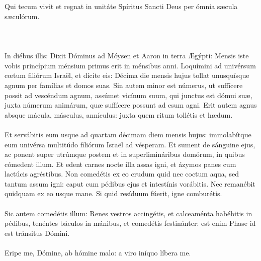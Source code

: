 \documentclass[12pt, a4paper]{article}
\begin{document}
	\\\\
	Qui tecum vivit et regnat in unitáte Spíritus Sancti Deus per ómnia sæcula sæculórum.
	\\\\
	\\
	\\
	In diébus illis: Dixit Dóminus ad Móysen et Aaron in terra Ægýpti: Mensis iste vobis princípium ménsium primus erit in ménsibus anni. Loquímini ad univérsum cœtum filiórum Israël, et dícite eis: Décima die mensis hujus tollat unusquísque agnum per famílias et domos suas. Sin autem minor est númerus, ut suffícere possit ad vescéndum agnum, assúmet vicínum suum, qui junctus est dómui suæ, juxta númerum animárum, quæ suffícere possunt ad esum agni. Erit autem agnus absque mácula, másculus, annículus: juxta quem ritum tollétis et hædum.
	\\\\
	Et servábitis eum usque ad quartam décimam diem mensis hujus: immolabítque eum univérsa multitúdo filiórum Israël ad vésperam. Et sument de sánguine ejus, ac ponent super utrúmque postem et in superlimináribus domórum, in quibus cómedent illum. Et edent carnes nocte illa assas igni, et ázymos panes cum lactúcis agréstibus. Non comedétis ex eo crudum quid nec coctum aqua, sed tantum assum igni: caput cum pédibus ejus et intestínis vorábitis. Nec remanébit quidquam ex eo usque mane. Si quid resíduum fúerit, igne comburétis.
	\\\\
	Sic autem comedétis illum: Renes vestros accingétis, et calceaménta habébitis in pédibus, tenéntes báculos in mánibus, et comedétis festinánter: est enim Phase id est tránsitus Dómini.
	\\\\
	Eripe me, Dómine, ab hómine malo: a viro iníquo líbera me.
	\\
	
\end{document}

